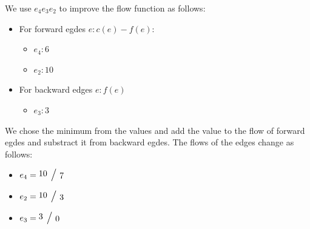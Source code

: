 We use $e_4 e_3 e_2$ to improve the flow function as follows:
\begin{itemize}
\item For forward egdes $e: c(e) - f(e)$:
\begin{itemize}
	\item $e_4: 6$
	\item $e_2: 10$
\end{itemize}
\item For backward edges $e: f(e)$
\begin{itemize}
\item $e_3: 3$
\end{itemize}
\end{itemize}
We chose the minimum from the values and add the value to the flow of forward egdes and substract it from backward egdes. The flows of the edges change as follows:
\begin{itemize}
\item $e_4 = \xfrac{10}{7}$
\item $e_2 = \xfrac{10}{3}$
\item $e_3 = \xfrac{3}{0}$
\end{itemize} 

